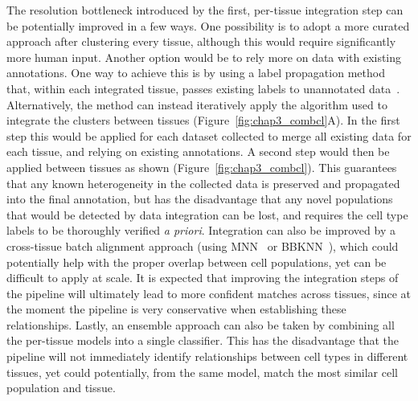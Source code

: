 The resolution bottleneck introduced by the first, per-tissue integration step can be potentially improved in a few ways. One possibility is to adopt a more curated approach after clustering every tissue, although this would require significantly more human input. Another option would be to rely more on data with existing annotations. One way to achieve this is by using a label propagation method that, within each integrated tissue, passes existing labels to unannotated data~\citep{barkas_joint_2019}. Alternatively, the method can instead iteratively apply the algorithm used to integrate the clusters between tissues (Figure~\ref{fig:chap3_combcl}A). In the first step this would be applied for each dataset collected to merge all existing data for each tissue, and relying on existing annotations. A second step would then be applied between tissues as shown (Figure~\ref{fig:chap3_combcl}). This guarantees that any known heterogeneity in the collected data is preserved and propagated into the final annotation, but has the disadvantage that any novel populations that would be detected by data integration can be lost, and requires the cell type labels to be thoroughly verified \textit{a priori}. Integration can also be improved by a cross-tissue batch alignment approach (using MNN~\citep{haghverdi_batch_2018} or BBKNN~\citep{polanski_bbknn:_2019}), which could potentially help with the proper overlap between cell populations, yet can be difficult to apply at scale. It is expected that improving the integration steps of the pipeline will ultimately lead to more confident matches across tissues, since at the moment the pipeline is very conservative when establishing these relationships. Lastly, an ensemble approach can also be taken by combining all the per-tissue models into a single classifier. This has the disadvantage that the pipeline will not immediately identify relationships between cell types in different tissues, yet could potentially, from the same model, match the most similar cell population and tissue.

